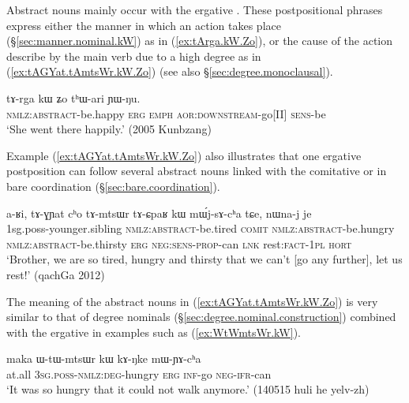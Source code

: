 Abstract nouns mainly occur with the ergative . These postpositional phrases express either the manner in which an action takes place (§\ref{sec:manner.nominal.kW}) as in (\ref{ex:tArga.kW.Zo}), or the cause of the action describe by the main verb due to a high degree as in (\ref{ex:tAGYat.tAmtsWr.kW.Zo}) (see also §\ref{sec:degree.monoclausal}). 


\begin{exe}
\ex \label{ex:tArga.kW.Zo}
\gll  tɤ-rga kɯ ʑo tʰɯ-ari ɲɯ-ŋu. \\
\textsc{nmlz}:\textsc{abstract}-be.happy \textsc{erg} \textsc{emph} \textsc{aor}:\textsc{downstream}-go[II] \textsc{sens}-be \\
\glt  `She went there happily.' (2005 Kunbzang)
\end{exe}

Example (\ref{ex:tAGYat.tAmtsWr.kW.Zo}) also illustrates that one ergative postposition can follow several abstract nouns linked with the comitative  or in bare coordination (§\ref{sec:bare.coordination}). 

\begin{exe}
\ex \label{ex:tAGYat.tAmtsWr.kW.Zo}
\gll  a-ʁi, tɤ-ɣɲat cʰo tɤ-mtsɯr tɤ-ɕpaʁ kɯ mɯ́j-sɤ-cʰa tɕe, nɯna-j je \\
1sg.poss-younger.sibling \textsc{nmlz}:\textsc{abstract}-be.tired \textsc{comit} \textsc{nmlz}:\textsc{abstract}-be.hungry \textsc{nmlz}:\textsc{abstract}-be.thirsty \textsc{erg} \textsc{neg}:\textsc{sens}-\textsc{prop}-can \textsc{lnk} rest:\textsc{fact}-\textsc{1pl} \textsc{hort} \\
\glt `Brother, we are so tired, hungry and thirsty that we can't [go any further], let us rest!' (qachGa 2012) 
\end{exe}

The meaning of the abstract nouns in (\ref{ex:tAGYat.tAmtsWr.kW.Zo}) is very similar to that of degree nominals (§\ref{sec:degree.nominal.construction}) combined with the ergative in examples such as (\ref{ex:WtWmtsWr.kW}).
 
\begin{exe}
\ex \label{ex:WtWmtsWr.kW}
\gll  maka ɯ-tɯ-mtsɯr kɯ kɤ-ŋke mɯ-ɲɤ-cʰa \\
at.all \textsc{3sg}.\textsc{poss}-\textsc{nmlz}:\textsc{deg}-hungry \textsc{erg} \textsc{inf}-go \textsc{neg}-\textsc{ifr}-can \\
\glt `It was so hungry that it could not walk anymore.'  (140515 huli he yelv-zh)
\end{exe}

